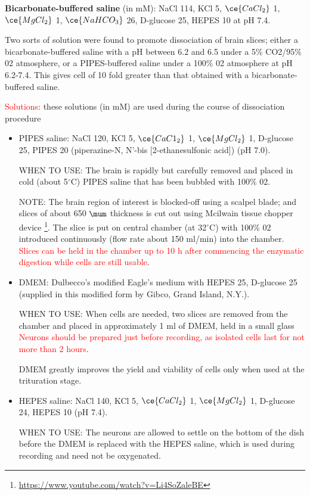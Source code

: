 \begin{itemize}
{\bf Bicarbonate-buffered saline} (in mM):  NaCl 114, KCl 5,  $\ce{CaCl_2}$  1,
$\ce{MgCl_2}$ 1, $\ce{NaHCO_3}$  26, D-glucose 25, HEPES 10 at pH 7.4.

Two sorts of solution were found to promote dissociation of brain slices; either
a bicarbonate-buffered saline with a  pH between 6.2 and 6.5 under a  5\%
CO2/95\% 02 atmosphere, or a  PIPES-buffered saline under a  100\% 02 atmosphere
at pH 6.2-7.4. This gives cell of 10 fold greater than that obtained with a
bicarbonate-buffered saline.


\textcolor{red}{Solutions}: these solutions (in mM) are used during the course
of dissociation procedure
\begin{itemize}
  \item PIPES saline: NaCl 120, KCl 5, $\ce{CaC1_2}$ 1, $\ce{MgCl_2}$ 1,
  D-glucose 25, PIPES 20 (piperazine-N, N'-bis [2-ethanesulfonic acid]) (pH 7.0).

WHEN TO USE: The brain is rapidly but carefully removed and placed in cold
(about 5$^\circ$C) PIPES saline that has been bubbled with 100\% 02.

NOTE: The brain region of interest is blocked-off using a scalpel blade; and
slices of about 650 $\mum$ thickness is cut out using Mcilwain tissue chopper
device \footnote{\url{https://www.youtube.com/watch?v=Li4SoZaleBE}}.
The slice is put on central chamber (at 32$^\circ$C) with 100\% 02 introduced
continuously (flow rate about 150 ml/min) into the chamber.
\textcolor{red}{Slices can be held in the chamber up to 10 h after commencing
the enzymatic digestion while cells are still usable}.

   \item DMEM: Dulbecco's modified Eagle's medium with HEPES 25, D-glucose 25
(supplied in this modified form by Gibco, Grand Island, N.Y.).

WHEN TO USE: When cells are needed, two slices are removed from the chamber and
placed in approximately 1 ml of DMEM, held in a small glass
\textcolor{red}{Neurons should be prepared just before recording, as isolated
cells last for not more than 2 hours}.

DMEM greatly improves the yield and viability of cells only when used at the
trituration stage.

   \item HEPES saline: NaCl 140, KCl 5, $\ce{CaCl_2}$ 1, $\ce{MgCl_2}$ 1,
   D-glucose 24, HEPES 10 (pH 7.4).

WHEN TO USE: The neurons are allowed to settle on the bottom of the dish before
the DMEM is replaced with the HEPES saline, which is used during recording and
need not be oxygenated.


\end{itemize}
\end{itemize}
